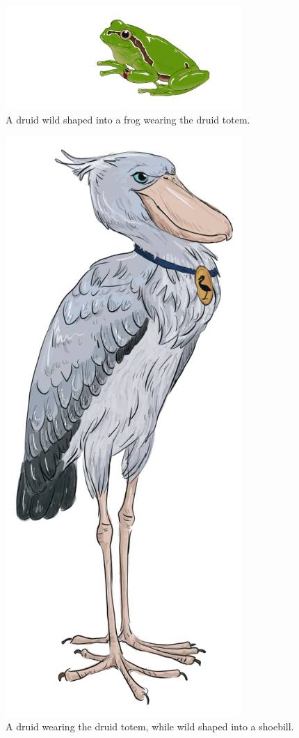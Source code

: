 \documentclass[letter,10pt,twocolumn,openany]{dndbook}
\begin{document}
\begin{figure}
    \includegraphics[width=9cm]{images/frog.png}
    \caption{A druid wild shaped into a frog wearing the druid totem.}
\end{figure}

\begin{figure}
    \includegraphics[width=9cm]{images/shoebill.png}
    \caption{A druid wearing the druid totem, while wild shaped into a shoebill.}
\end{figure}
\end{document}
